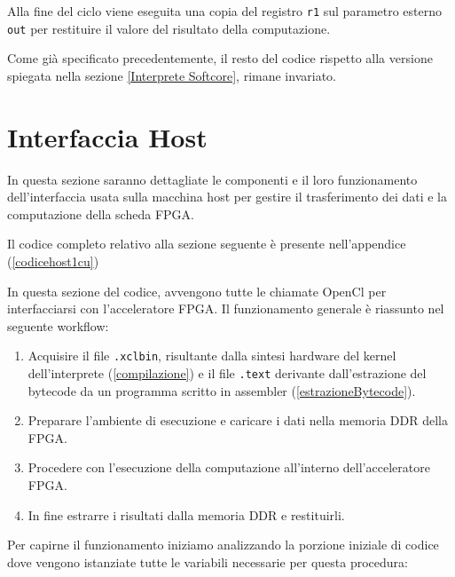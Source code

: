 Alla fine del ciclo viene eseguita una copia del registro \texttt{r1} sul parametro esterno \texttt{out} per restituire il valore del risultato della computazione.

Come già specificato precedentemente, il resto del codice rispetto alla versione spiegata nella sezione \ref{Interprete Softcore}, rimane invariato.

\section{Interfaccia Host}
\label{host}
In questa sezione saranno dettagliate le componenti e il loro funzionamento dell'interfaccia usata sulla macchina host per gestire il trasferimento dei dati e la computazione della scheda FPGA.

\vspace{0.3cm}

\noindent Il codice completo relativo alla sezione seguente è presente nell'appendice (\ref{codicehost1cu})

\vspace{0.3cm}

\noindent In questa sezione del codice, avvengono tutte le chiamate OpenCl per interfacciarsi con l'acceleratore FPGA. 
Il funzionamento generale è riassunto nel seguente workflow: 
\begin{enumerate}
    \item Acquisire il file \texttt{.xclbin}, risultante dalla sintesi hardware del kernel dell'interprete (\ref{compilazione}) e il file \texttt{.text} derivante dall'estrazione del bytecode da un programma scritto in assembler (\ref{estrazioneBytecode}).
    \item Preparare l'ambiente di esecuzione e caricare i dati nella memoria DDR della FPGA.
    \item Procedere con l'esecuzione della computazione all'interno dell'acceleratore FPGA.
    \item In fine estrarre i risultati dalla memoria DDR e restituirli.
\end{enumerate}

\vspace{0.3cm}

Per capirne il funzionamento iniziamo analizzando la porzione iniziale di codice dove vengono istanziate tutte le variabili necessarie per questa procedura:

